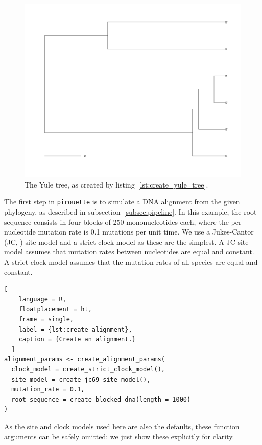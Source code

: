 \documentclass{article}
\begin{document}
\begin{figure}[ht]
  \includegraphics[width=\textwidth]{example_1/true_tree.png}
  \caption{The Yule tree, as created by listing~\ref{lst:create_yule_tree}.}
  \label{fig:yule_tree}
\end{figure}

The first step in \verb;pirouette; is to simulate a DNA alignment from the 
given phylogeny, as described in subsection~\ref{subsec:pipeline}.
In this example, the root sequence consists in four blocks of 250 
mononucleotides each, 
where the per-nucleotide mutation rate is 0.1 mutations per unit time.
We use a Jukes-Cantor (JC, \cite{jukes1969evolution}) site model
and a strict clock model as these are the simplest.
A JC site model assumes that mutation rates between nucleotides are equal and constant. 
A strict clock model assumes that the mutation rates 
of all species are equal and constant.

\begin{lstlisting}[
    language = R,
    floatplacement = ht,
    frame = single,
    label = {lst:create_alignment}, 
    caption = {Create an alignment.}
  ]
alignment_params <- create_alignment_params(
  clock_model = create_strict_clock_model(),
  site_model = create_jc69_site_model(),
  mutation_rate = 0.1,
  root_sequence = create_blocked_dna(length = 1000)
)
\end{lstlisting}

As the site and clock models used here are also the defaults, 
these function arguments can be safely omitted: we just show these
explicitly for clarity.
\end{document}
